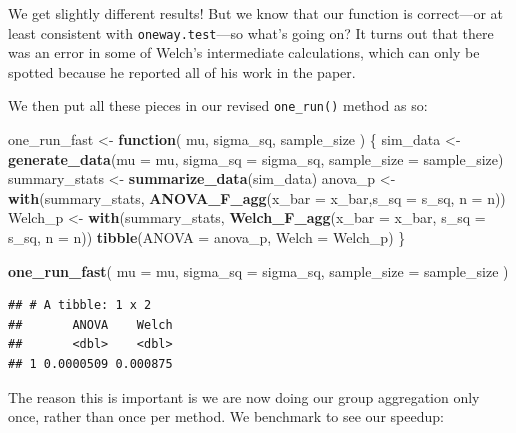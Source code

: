\documentclass[
]{book}
\newenvironment{Shaded}{\begin{snugshade}}{\end{snugshade}}
\newcommand{\AttributeTok}[1]{\textcolor[rgb]{0.13,0.29,0.53}{#1}}
\newcommand{\ControlFlowTok}[1]{\textcolor[rgb]{0.13,0.29,0.53}{\textbf{#1}}}
\newcommand{\FunctionTok}[1]{\textcolor[rgb]{0.13,0.29,0.53}{\textbf{#1}}}
\newcommand{\NormalTok}[1]{#1}
\newcommand{\OtherTok}[1]{\textcolor[rgb]{0.56,0.35,0.01}{#1}}
\begin{document}
We get slightly different results! But we know that our function is correct---or at least consistent with \texttt{oneway.test}---so what's going on? It turns out that there was an error in some of Welch's intermediate calculations, which can only be spotted because he reported all of his work in the paper.

We then put all these pieces in our revised \texttt{one\_run()} method as so:

\begin{Shaded}
\begin{Highlighting}[]
\NormalTok{one\_run\_fast }\OtherTok{\textless{}{-}} \ControlFlowTok{function}\NormalTok{( mu, sigma\_sq, sample\_size ) \{}
\NormalTok{  sim\_data }\OtherTok{\textless{}{-}} \FunctionTok{generate\_data}\NormalTok{(}\AttributeTok{mu =}\NormalTok{ mu, }\AttributeTok{sigma\_sq =}\NormalTok{ sigma\_sq,}
                            \AttributeTok{sample\_size =}\NormalTok{ sample\_size)}
\NormalTok{  summary\_stats }\OtherTok{\textless{}{-}} \FunctionTok{summarize\_data}\NormalTok{(sim\_data)}
\NormalTok{  anova\_p }\OtherTok{\textless{}{-}} \FunctionTok{with}\NormalTok{(summary\_stats, }
                  \FunctionTok{ANOVA\_F\_agg}\NormalTok{(}\AttributeTok{x\_bar =}\NormalTok{ x\_bar,}\AttributeTok{s\_sq =}\NormalTok{ s\_sq, }\AttributeTok{n =}\NormalTok{ n))}
\NormalTok{  Welch\_p }\OtherTok{\textless{}{-}} \FunctionTok{with}\NormalTok{(summary\_stats, }
                  \FunctionTok{Welch\_F\_agg}\NormalTok{(}\AttributeTok{x\_bar =}\NormalTok{ x\_bar, }\AttributeTok{s\_sq =}\NormalTok{ s\_sq, }\AttributeTok{n =}\NormalTok{ n))}
  \FunctionTok{tibble}\NormalTok{(}\AttributeTok{ANOVA =}\NormalTok{ anova\_p, }\AttributeTok{Welch =}\NormalTok{ Welch\_p)}
\NormalTok{\}}

\FunctionTok{one\_run\_fast}\NormalTok{( }\AttributeTok{mu =}\NormalTok{ mu, }\AttributeTok{sigma\_sq =}\NormalTok{ sigma\_sq,}
              \AttributeTok{sample\_size =}\NormalTok{ sample\_size )}
\end{Highlighting}
\end{Shaded}

\begin{verbatim}
## # A tibble: 1 x 2
##       ANOVA    Welch
##       <dbl>    <dbl>
## 1 0.0000509 0.000875
\end{verbatim}

The reason this is important is we are now doing our group aggregation only once, rather than once per method.
We benchmark to see our speedup:
\end{document}
